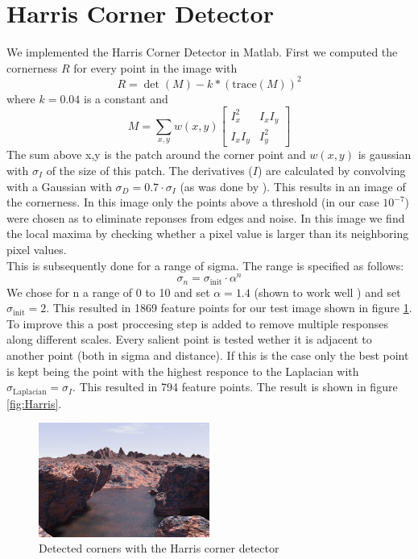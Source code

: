\documentclass{article}
\begin{document}
\section{Harris Corner Detector}
We implemented the Harris Corner Detector in Matlab. 
First we computed the cornerness $R$ for every point in the image with
\begin{equation}
R = \det(M) - k*(\mathrm{trace}(M))^2
\end{equation}
where $k=0.04$ is a constant and
\begin{equation}
M = \sum_{x,y} w(x,y) \begin{bmatrix}
I_x^2 & I_x I_y\\
I_x I_y & I_y^2
\end{bmatrix}
\end{equation}
The sum above x,y is the patch around the corner point and $w(x,y)$ is gaussian with $\sigma_I$ of the size of this patch. The derivatives ($I$) are calculated by convolving with a Gaussian with $\sigma_D = 0.7 \cdot \sigma_I$ (as was done by \cite{Miko}). This results in an image of the cornerness. In this image only the points above a threshold (in our case $10^{-7}$) were chosen as to eliminate reponses from edges and noise. In this image we find the local maxima by checking whether a pixel value is larger than its neighboring pixel values.\\
This is subsequently done for a range of sigma. The range is specified as follows:
\[
\sigma_n = \sigma_\mathrm{init} \cdot \alpha^n
\]
We chose for n a range of 0 to 10 and set $\alpha = 1.4$ (shown to work well \cite{lindeberg}) and set $\sigma_\mathrm{init} = 2$. This resulted in 1869 feature points for our test image shown in figure \ref{fig:mountain}.\\
To improve this a post proccesing step is added to remove multiple responses along different scales. Every salient point is tested wether it is adjacent to another point (both in sigma and distance). If this is the case only the best point is kept being the point with the highest responce to the Laplacian with $\sigma_\mathrm{Laplacian} = \sigma_I$. This resulted in 794 feature points. The result is shown in figure \ref{fig:Harris}.

\begin{figure}[ht]
\centering
\includegraphics[width=0.5\textwidth]{img/mountain.jpg}
\caption{Detected corners with the Harris corner detector}
\label{fig:mountain}
\end{figure}
\end{document}
